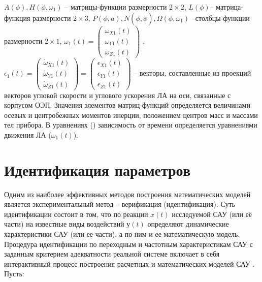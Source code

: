 $A\left(\phi{}\right),H\left(\phi{},{\omega{}}_1\right)$ – матрицы-функции размерности $2 \times 2$, $L(\phi)$– матрица-функция размерности $2 \times 3$,
$P\left(\phi{},a\right),N\left(\phi{},\dot{\phi{}}\right),\Omega{}\left(\phi{},{\omega{}}_1\right)$ –столбцы-функции размерности $2 \times 1$,
${\omega{}}_1(t)=\left(\begin{array}{
	ccc}
{\omega{}}_{X1}(t) \\
{\omega{}}_{Y1}(t) \\
{\omega{}}_{Z1}(t)
\end{array}\right)$
, ${\epsilon{}}_1(t)=\left(\begin{array}{
	ccc}
{\dot{\omega{}}}_{X1}(t) \\
{\dot{\omega{}}}_{Y1}(t) \\
{\dot{\omega{}}}_{Z1}(t)
\end{array}\right)=\left(\begin{array}{
	ccc}
{\epsilon{}}_{X1}(t) \\
{\epsilon{}}_{Y1}(t) \\
{\epsilon{}}_{Z1}(t)
\end{array}\right)$
– векторы, составленные из проекций векторов угловой скорости и углового ускорения ЛА на оси, связанные с корпусом ОЭП. Значения элементов матриц-функций определяется величинами осевых и центробежных моментов инерции, положением центров масс и массами тел прибора. В уравнениях () зависимость от времени определяется уравнениями движения ЛА ($\omega_1(t)$).

\section{Идентификация параметров} \label{sec:ch2/sec4}

Одним из наиболее эффективных методов построения математических моделей является экспериментальный метод – верификация (идентификация). Суть идентификации состоит в том, что по реакции $x(t)$ исследуемой САУ (или её части) на известные виды воздействий $у(t)$ определяют динамические характеристики САУ (или ее части), а по ним и ее математическую модель. Процедура идентификации по переходным и частотным характеристикам САУ с заданным критерием адекватности реальной системе включает в себя интерактивный процесс построения расчетных и математических моделей САУ \cite[]{Karpov}. Пусть:

